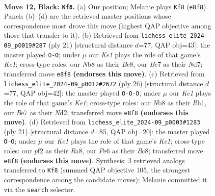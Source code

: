 \documentclass[11pt]{article}
\begin{document}
\clearpage

\begin{figure}[p]\centering
\begin{subfigure}{0.46\textwidth}\centering
\resizebox{\linewidth}{!}{%
\newchessgame
\chessboard[
  setfen={rnb1k1r1/1p1qbp1p/p3p1p1/2Pp3n/3P4/1NN5/PP3PPP/1RBQKB1R b q - 1 12},
  showmover=false,
  pgfstyle=straightmove, color=movearrow, markmove={e8-f8}
]}
\caption{}
\end{subfigure}\hfill
\begin{subfigure}{0.46\textwidth}\centering
\resizebox{\linewidth}{!}{%
\newchessgame
\chessboard[
  setfen={r1b1k2r/pp1nqpbp/2n1p1p1/2p1P3/2N5/2PB1N2/PP3PPP/R1BQR1K1 b kq - 0 11},
  showmover=false,
  pgfstyle=straightmove, color=movearrow, markmove={e8-g8}
]}
\caption{}
\end{subfigure}
\\[4pt]
\begin{subfigure}{0.46\textwidth}\centering
\resizebox{\linewidth}{!}{%
\newchessgame
\chessboard[
  setfen={2kr1b1r/pppb2pp/2n2nq1/8/2B1p3/1PN1P2P/PB1NQPP1/R3K2R w KQ - 2 14},
  showmover=false,
  pgfstyle=straightmove, color=movearrow, markmove={e1-c1}
]}
\caption{}
\end{subfigure}\hfill
\begin{subfigure}{0.46\textwidth}\centering
\resizebox{\linewidth}{!}{%
\newchessgame
\chessboard[
  setfen={r1bqk2r/1p2ppbp/2p2np1/p1n5/P6Q/2N2N2/BPPP2PP/R1B2RK1 b kq - 2 11},
  showmover=false,
  pgfstyle=straightmove, color=movearrow, markmove={e8-g8}
]}
\caption{}
\end{subfigure}
\caption{\textbf{Move 12, Black: \texttt{Kf8}.} (a) Our position; Melanie plays \texttt{Kf8} (\texttt{e8f8}). Panels (b)--(d) are the retrieved master positions whose correspondence most drove this move (highest QAP objective among those that transfer to it). (b) Retrieved from \texttt{lichess\_elite\_2024-09\_p0019\#287} (ply 21) [structural distance $d$=77, QAP obj=43]: the master played \texttt{O-O}; under $\mu$ our \emph{Ke1} plays the role of that game's \emph{Ke1}; cross-type roles: our \emph{N}b8 as their \emph{B}c8, our \emph{B}e7 as their \emph{N}d7; transferred move \texttt{e8f8} \textbf{(endorses this move)}. (c) Retrieved from \texttt{lichess\_elite\_2024-09\_p0012\#2672} (ply 26) [structural distance $d$=77, QAP obj=42]: the master played \texttt{O-O-O}; under $\mu$ our \emph{Ke1} plays the role of that game's \emph{Ke1}; cross-type roles: our \emph{N}b8 as their \emph{R}h1, our \emph{B}e7 as their \emph{N}d2; transferred move \texttt{e8f8} \textbf{(endorses this move)}. (d) Retrieved from \texttt{lichess\_elite\_2024-09\_p0003\#1283} (ply 21) [structural distance $d$=85, QAP obj=20]: the master played \texttt{O-O}; under $\mu$ our \emph{Ke1} plays the role of that game's \emph{Ke1}; cross-type roles: our \emph{p}f2 as their \emph{R}a8, our \emph{P}e6 as their \emph{B}c8; transferred move \texttt{e8f8} \textbf{(endorses this move)}. Synthesis: 3 retrieved analogs transferred to \texttt{Kf8} (summed QAP objective 105, the strongest correspondence among the candidate moves); Melanie committed it via the \texttt{search} selector.}
\label{fig:thought-m23}
\end{figure}
\end{document}
